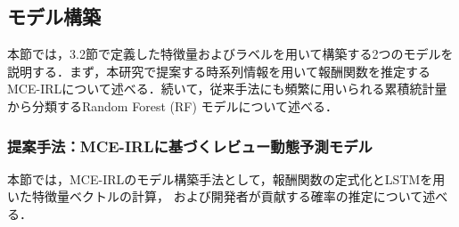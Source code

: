 \documentclass[submit,noauthor,ses,dvipdfmx]{ipsj}
\begin{document}



\subsection{モデル構築}

本節では，3.2節で定義した特徴量およびラベルを用いて構築する2つのモデルを説明する．まず，本研究で提案する時系列情報を用いて報酬関数を推定するMCE-IRLについて述べる．続いて，従来手法にも頻繁に用いられる累積統計量から分類するRandom Forest (RF) モデルについて述べる．

\subsubsection{提案手法：MCE-IRLに基づくレビュー動態予測モデル}\label{sec:mce-irl}

本節では，MCE-IRLのモデル構築手法として，報酬関数の定式化とLSTMを用いた特徴量ベクトルの計算，
および開発者が貢献する確率の推定について述べる．
\end{document}
